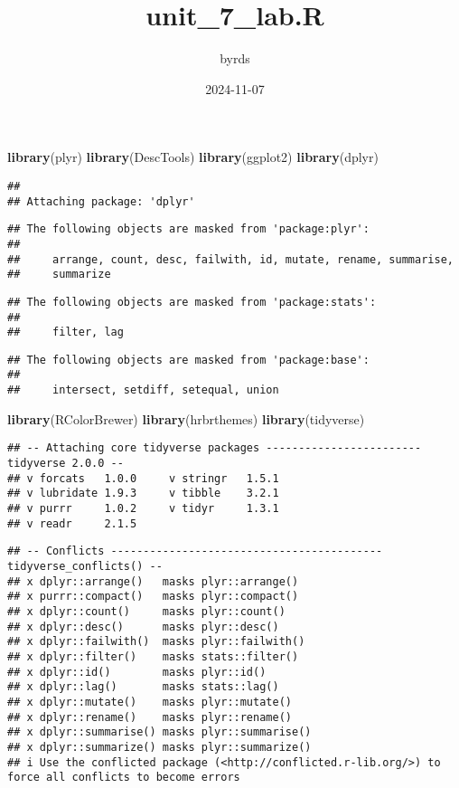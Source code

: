 \documentclass[
]{article}
\title{unit\_7\_lab.R}
\author{byrds}
\date{2024-11-07}
\newenvironment{Shaded}{\begin{snugshade}}{\end{snugshade}}
\newcommand{\FunctionTok}[1]{\textcolor[rgb]{0.13,0.29,0.53}{\textbf{#1}}}
\newcommand{\NormalTok}[1]{#1}
\begin{document}
\maketitle

\begin{Shaded}
\begin{Highlighting}[]
\FunctionTok{library}\NormalTok{(plyr)}
\FunctionTok{library}\NormalTok{(DescTools)}
\FunctionTok{library}\NormalTok{(ggplot2)}
\FunctionTok{library}\NormalTok{(dplyr)}
\end{Highlighting}
\end{Shaded}

\begin{verbatim}
## 
## Attaching package: 'dplyr'
\end{verbatim}

\begin{verbatim}
## The following objects are masked from 'package:plyr':
## 
##     arrange, count, desc, failwith, id, mutate, rename, summarise,
##     summarize
\end{verbatim}

\begin{verbatim}
## The following objects are masked from 'package:stats':
## 
##     filter, lag
\end{verbatim}

\begin{verbatim}
## The following objects are masked from 'package:base':
## 
##     intersect, setdiff, setequal, union
\end{verbatim}

\begin{Shaded}
\begin{Highlighting}[]
\FunctionTok{library}\NormalTok{(RColorBrewer)}
\FunctionTok{library}\NormalTok{(hrbrthemes)}
\FunctionTok{library}\NormalTok{(tidyverse)}
\end{Highlighting}
\end{Shaded}

\begin{verbatim}
## -- Attaching core tidyverse packages ------------------------ tidyverse 2.0.0 --
## v forcats   1.0.0     v stringr   1.5.1
## v lubridate 1.9.3     v tibble    3.2.1
## v purrr     1.0.2     v tidyr     1.3.1
## v readr     2.1.5
\end{verbatim}

\begin{verbatim}
## -- Conflicts ------------------------------------------ tidyverse_conflicts() --
## x dplyr::arrange()   masks plyr::arrange()
## x purrr::compact()   masks plyr::compact()
## x dplyr::count()     masks plyr::count()
## x dplyr::desc()      masks plyr::desc()
## x dplyr::failwith()  masks plyr::failwith()
## x dplyr::filter()    masks stats::filter()
## x dplyr::id()        masks plyr::id()
## x dplyr::lag()       masks stats::lag()
## x dplyr::mutate()    masks plyr::mutate()
## x dplyr::rename()    masks plyr::rename()
## x dplyr::summarise() masks plyr::summarise()
## x dplyr::summarize() masks plyr::summarize()
## i Use the conflicted package (<http://conflicted.r-lib.org/>) to force all conflicts to become errors
\end{verbatim}
\end{document}
